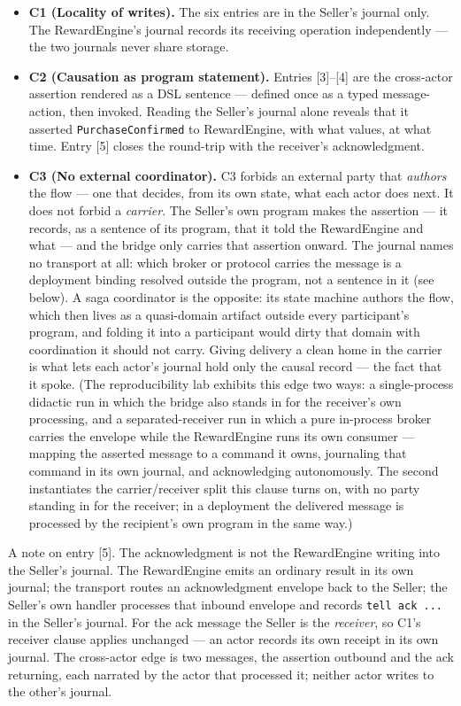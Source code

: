 \documentclass[
]{article}
\providecommand{\tightlist}{%
  \setlength{\itemsep}{0pt}\setlength{\parskip}{0pt}}
\let\origtexttt\texttt%
\renewcommand{\texttt}[1]{\origtexttt{\seqsplit{#1}}}%
\let\texttt\origtexttt%
\begin{document}
\begin{itemize}
\tightlist
\item
  \textbf{C1 (Locality of writes).} The six entries are in the Seller's
  journal only. The RewardEngine's journal records its receiving
  operation independently --- the two journals never share storage.
\item
  \textbf{C2 (Causation as program statement).} Entries {[}3{]}--{[}4{]}
  are the cross-actor assertion rendered as a DSL sentence --- defined
  once as a typed message-action, then invoked. Reading the Seller's
  journal alone reveals that it asserted \texttt{PurchaseConfirmed} to
  RewardEngine, with what values, at what time. Entry {[}5{]} closes the
  round-trip with the receiver's acknowledgment.
\item
  \textbf{C3 (No external coordinator).} C3 forbids an external party
  that \emph{authors} the flow --- one that decides, from its own state,
  what each actor does next. It does not forbid a \emph{carrier}. The
  Seller's own program makes the assertion --- it records, as a sentence
  of its program, that it told the RewardEngine and what --- and the
  bridge only carries that assertion onward. The journal names no
  transport at all: which broker or protocol carries the message is a
  deployment binding resolved outside the program, not a sentence in it
  (see below). A saga coordinator is the opposite: its state machine
  authors the flow, which then lives as a quasi-domain artifact outside
  every participant's program, and folding it into a participant would
  dirty that domain with coordination it should not carry. Giving
  delivery a clean home in the carrier is what lets each actor's journal
  hold only the causal record --- the fact that it spoke. (The
  reproducibility lab exhibits this edge two ways: a single-process
  didactic run in which the bridge also stands in for the receiver's own
  processing, and a separated-receiver run in which a pure in-process
  broker carries the envelope while the RewardEngine runs its own
  consumer --- mapping the asserted message to a command it owns,
  journaling that command in its own journal, and acknowledging
  autonomously. The second instantiates the carrier/receiver split this
  clause turns on, with no party standing in for the receiver; in a
  deployment the delivered message is processed by the recipient's own
  program in the same way.)
\end{itemize}

A note on entry {[}5{]}. The acknowledgment is not the RewardEngine
writing into the Seller's journal. The RewardEngine emits an ordinary
result in its own journal; the transport routes an acknowledgment
envelope back to the Seller; the Seller's own handler processes that
inbound envelope and records \texttt{tell\ ack\ ...} in the Seller's
journal. For the ack message the Seller is the \emph{receiver}, so C1's
receiver clause applies unchanged --- an actor records its own receipt
in its own journal. The cross-actor edge is two messages, the assertion
outbound and the ack returning, each narrated by the actor that
processed it; neither actor writes to the other's journal.
\end{document}
